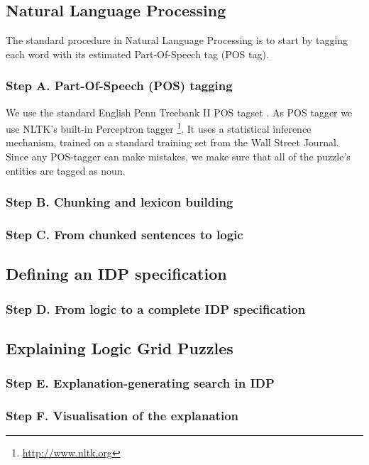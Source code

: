\subsection{Natural Language Processing} \label{nlp}
The standard procedure in Natural Language Processing is to start by tagging each word with its estimated Part-Of-Speech tag (POS tag). 

\subsubsection*{Step A. Part-Of-Speech (POS) tagging} \label{pos_tagging}
We use the standard English Penn Treebank II POS tagset \cite{marcus1993building}. As POS tagger we use NLTK's built-in Perceptron tagger \footnote{\url{http://www.nltk.org}}. It uses a statistical inference mechanism, trained on a standard training set from the Wall Street Journal. Since any POS-tagger can make mistakes, we make sure that all of the puzzle’s entities are tagged as noun.

\subsubsection*{Step B. Chunking and lexicon building} \label{chunking_lexicon}


\subsubsection*{Step C. From chunked sentences to logic} \label{chunked_to_logic}


\subsection{Defining an IDP specification} \label{idp_spec}

\subsubsection*{Step D. From logic to a complete IDP specification} \label{logic_to_idp}


\subsection{Explaining Logic Grid Puzzles} \label{explaining_puzzles}

\subsubsection*{Step E. Explanation-generating search in IDP} \label{idp_search}


\subsubsection*{Step F. Visualisation of the explanation} \label{visualisation_explanation}

